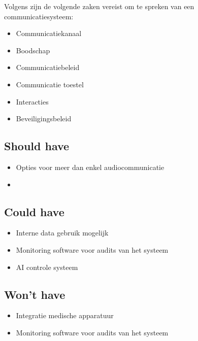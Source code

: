 Volgens \textcite{Coiera2006} zijn de volgende zaken vereist om te spreken van een communicatiesysteem:
\begin{itemize}
  \item Communicatiekanaal
  \item Boodschap
  \item Communicatiebeleid
  \item Communicatie toestel
  \item Interacties
  \item Beveiligingsbeleid
\end{itemize}

\subsection{Should have}
\label{sec:Should-have}

\begin{itemize}
  \item Opties voor meer dan enkel audiocommunicatie
  \item 
\end{itemize}

\subsection{Could have}
\label{sec:Could-have}

\begin{itemize}
  \item Interne data gebruik mogelijk
  \item Monitoring software voor audits van het systeem
  \item AI controle systeem
\end{itemize}

\subsection{Won't have}
\label{sec:Wont-have}

\begin{itemize}
  \item Integratie medische apparatuur
  \item Monitoring software voor audits van het systeem
\end{itemize}

\section{}%
\label{sec:andere}%


